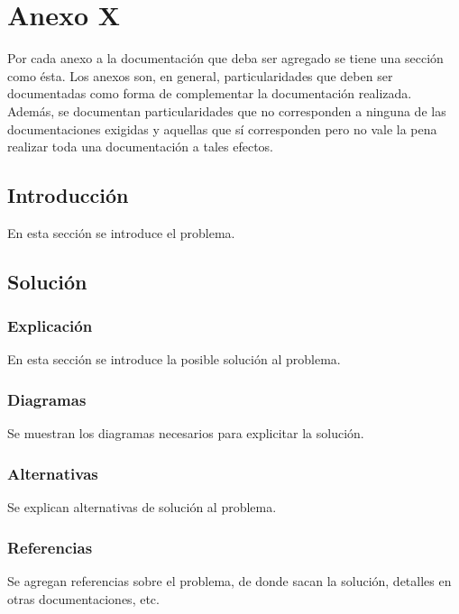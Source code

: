 \documentclass[10pt,spanish]{article}
\numberwithin{figure}{section} %
\begin{document}
\newpage
\tableofcontents

\newpage
\section{Anexo X}
Por cada anexo a la documentación que deba ser agregado se tiene una sección como ésta. Los anexos son, en general, particularidades que deben ser documentadas como forma de complementar la documentación realizada. Además, se documentan particularidades que no corresponden a ninguna de las documentaciones exigidas y aquellas que sí corresponden pero no vale la pena realizar toda una documentación a tales efectos.

\subsection{Introducción}
En esta sección se introduce el problema.

\subsection{Solución}

\subsubsection{Explicación}
En esta sección se introduce la posible solución al problema.

\subsubsection{Diagramas}
Se muestran los diagramas necesarios para explicitar la solución.

\subsubsection{Alternativas}
Se explican alternativas de solución al problema.

\subsubsection{Referencias}
Se agregan referencias sobre el problema, de donde sacan la solución, detalles en otras documentaciones, etc.
\end{document}
